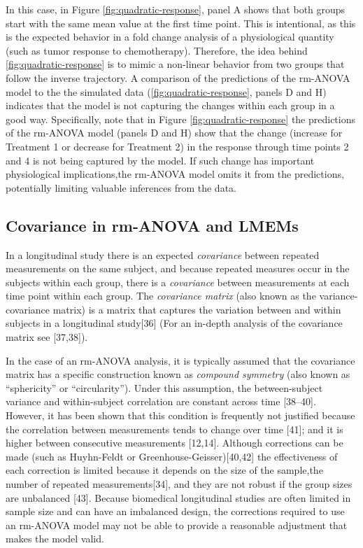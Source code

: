 \documentclass[
]{article}
\begin{document}
In this case, in Figure \ref{fig:quadratic-response}, panel A shows that both groups start with the same mean value at the first time point. This is intentional, as this is the expected behavior in a fold change analysis of a physiological quantity (such as tumor response to chemotherapy). Therefore, the idea behind \ref{fig:quadratic-response} is to mimic a non-linear behavior from two groups that follow the inverse trajectory. A comparison of the predictions of the rm-ANOVA model to the the simulated data (\ref{fig:quadratic-response}, panels D and H) indicates that the model is not capturing the changes within each group in a good way. Specifically, note that in Figure \ref{fig:quadratic-response} the predictions of the rm-ANOVA model (panels D and H) show that the change (increase for Treatment 1 or decrease for Treatment 2) in the response through time points 2 and 4 is not being captured by the model. If such change has important physiological implications,the rm-ANOVA model omits it from the predictions, potentially limiting valuable inferences from the data.

\hypertarget{covariance-in-rm-anova-and-lmems}{%
\subsection{Covariance in rm-ANOVA and LMEMs}\label{covariance-in-rm-anova-and-lmems}}

In a longitudinal study there is an expected \emph{covariance} between repeated measurements on the same subject, and because repeated measures occur in the subjects within each group, there is a \emph{covariance} between measurements at each time point within each group. The \emph{covariance matrix} (also known as the variance-covariance matrix) is a matrix that captures the variation between and within subjects in a longitudinal study{[}36{]} (For an in-depth analysis of the covariance matrix see {[}37,38{]}).

In the case of an rm-ANOVA analysis, it is typically assumed that the covariance matrix has a specific construction known as \emph{compound symmetry} (also known as ``sphericity'' or ``circularity''). Under this assumption, the between-subject variance and within-subject correlation are constant across time {[}38--40{]}. However, it has been shown that this condition is frequently not justified because the correlation between measurements tends to change over time {[}41{]}; and it is higher between consecutive measurements {[}12,14{]}. Although corrections can be made (such as Huyhn-Feldt or Greenhouse-Geisser){[}40,42{]} the effectiveness of each correction is limited because it depends on the size of the sample,the number of repeated measurements{[}34{]}, and they are not robust if the group sizes are unbalanced {[}43{]}. Because biomedical longitudinal studies are often limited in sample size and can have an imbalanced design, the corrections required to use an rm-ANOVA model may not be able to provide a reasonable adjustment that makes the model valid.
\end{document}
